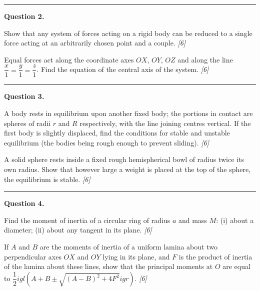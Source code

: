 \documentclass[11pt,a4paper]{article}
\newcommand{\pts}[1]{\hfill   \textit{[#1]}}
\begin{document}
\medskip\rule{\linewidth}{0.2pt}

\medskip


\noindent   \textbf{Question 2.}

\begin{parts}
  \item Show that any system of forces acting on a rigid body can be reduced to a single force acting at an arbitrarily chosen point and a couple. \pts{6}
  \item Equal forces act along the coordinate axes $OX$, $OY$, $OZ$ and along the line $\dfrac{x}{1} = \dfrac{y}{1} = \dfrac{z}{1}$. Find the equation of the central axis of the system. \pts{6}
\end{parts}

\medskip\rule{\linewidth}{0.2pt}

\medskip


\noindent   \textbf{Question 3.}

\begin{parts}
  \item A body rests in equilibrium upon another fixed body; the portions in contact are spheres of radii $r$ and $R$ respectively, with the line joining centres vertical. If the first body is slightly displaced, find the conditions for stable and unstable equilibrium (the bodies being rough enough to prevent sliding). \pts{6}
  \item A solid sphere rests inside a fixed rough hemispherical bowl of radius twice its own radius. Show that however large a weight is placed at the top of the sphere, the equilibrium is stable. \pts{6}
\end{parts}

\medskip\rule{\linewidth}{0.2pt}

\medskip


\noindent   \textbf{Question 4.}

\begin{parts}
  \item Find the moment of inertia of a circular ring of radius $a$ and mass $M$: (i) about a diameter; (ii) about any tangent in its plane. \pts{6}
  \item If $A$ and $B$ are the moments of inertia of a uniform lamina about two perpendicular axes $OX$ and $OY$ lying in its plane, and $F$ is the product of inertia of the lamina about these lines, show that the principal moments at $O$ are equal to $\dfrac{1}{2}igl(A + B \pm \sqrt{(A-B)^2 + 4F^2}igr)$. \pts{6}
\end{parts}
\end{document}

